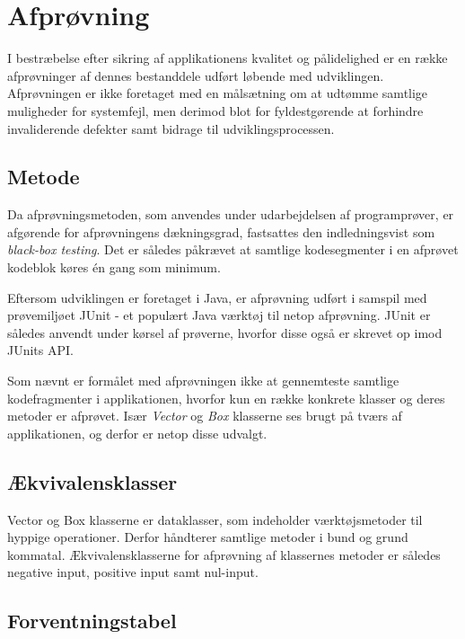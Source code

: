 \section{Afprøvning}
\label{sec:afproevning}
I bestræbelse efter sikring af applikationens kvalitet og pålidelighed er en række afprøvninger af dennes bestanddele udført løbende med udviklingen. Afprøvningen er ikke foretaget med en målsætning om at udtømme samtlige muligheder for systemfejl, men derimod blot for fyldestgørende at forhindre invaliderende defekter samt bidrage til udviklingsprocessen.

\subsection{Metode}
\label{subsec:metode}
Da afprøvningsmetoden, som anvendes under udarbejdelsen af programprøver, er afgørende for afprøvningens dækningsgrad, fastsattes den indledningsvist som \emph{black-box testing}. Det er således påkrævet at samtlige kodesegmenter i en afprøvet kodeblok køres én gang som minimum.

Eftersom udviklingen er foretaget i Java, er afprøvning udført i samspil med prøvemiljøet JUnit - et populært Java værktøj til netop afprøvning. JUnit er således anvendt under kørsel af prøverne, hvorfor disse også er skrevet op imod JUnits API.

Som nævnt er formålet med afprøvningen ikke at gennemteste samtlige kodefragmenter i applikationen, hvorfor kun en række konkrete klasser og deres metoder er afprøvet. Især \emph{Vector} og \emph{Box} klasserne ses brugt på tværs af applikationen, og derfor er netop disse udvalgt.

\subsection{Ækvivalensklasser}
\label{subsec:aekvivalensklasser}
Vector og Box klasserne er dataklasser, som indeholder værktøjsmetoder til hyppige operationer. Derfor håndterer samtlige metoder i bund og grund kommatal. Ækvivalensklasserne for afprøvning af klassernes metoder er således negative input, positive input samt nul-input.

\subsection{Forventningstabel}
\label{subsec:forventningstabel}

